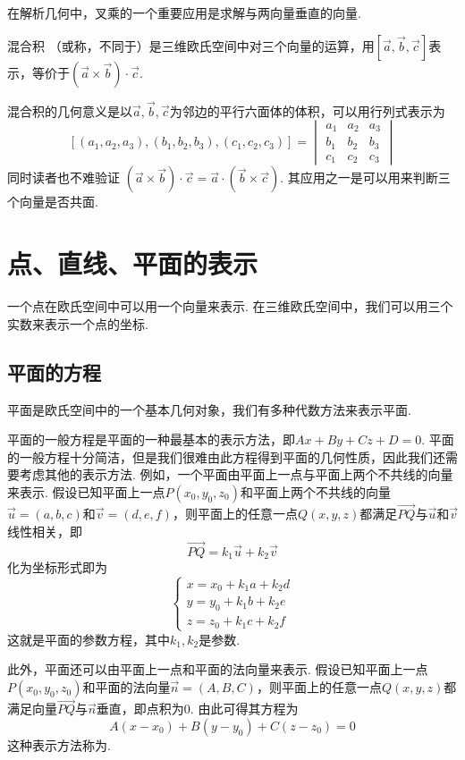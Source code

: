 在解析几何中，叉乘的一个重要应用是求解与两向量垂直的向量.
\begin{definition}{混合积}{}  
    （或称，不同于）是三维欧氏空间中对三个向量的运算，用$[\vec{a},\vec{b},\vec{c}]$表示，等价于$(\vec{a}\times\vec{b})\cdot\vec{c}$.
\end{definition}
混合积的几何意义是以$\vec{a},\vec{b},\vec{c}$为邻边的平行六面体的体积，可以用行列式表示为
\[[(a_1,a_2,a_3),(b_1,b_2,b_3),(c_1,c_2,c_3)]=\begin{vmatrix}
        a_1 & a_2 & a_3 \\
        b_1 & b_2 & b_3 \\
        c_1 & c_2 & c_3
    \end{vmatrix}\]
同时读者也不难验证 $ (\vec{a}\times\vec{b})\cdot\vec{c} = \vec{a}\cdot(\vec{b}\times\vec{c}) $. 其应用之一是可以用来判断三个向量是否共面.

\section{点、直线、平面的表示}

一个点在欧氏空间中可以用一个向量来表示. 在三维欧氏空间中，我们可以用三个实数来表示一个点的坐标.

\subsection{平面的方程}

平面是欧氏空间中的一个基本几何对象，我们有多种代数方法来表示平面.

平面的一般方程是平面的一种最基本的表示方法，即$Ax+By+Cz+D=0$. 平面的一般方程十分简洁，但是我们很难由此方程得到平面的几何性质，因此我们还需要考虑其他的表示方法. 例如，一个平面由平面上一点与平面上两个不共线的向量来表示. 假设已知平面上一点$P(x_0,y_0,z_0)$和平面上两个不共线的向量$\vec{u}=(a,b,c)$和$\vec{v}=(d,e,f)$，则平面上的任意一点$Q(x,y,z)$都满足$\overrightarrow{PQ}$与$\vec{u}$和$\vec{v}$线性相关，即
\[\overrightarrow{PQ}=k_1\vec{u}+k_2\vec{v}\]
化为坐标形式即为
\[\begin{cases}
        x=x_0+k_1a+k_2d \\
        y=y_0+k_1b+k_2e \\
        z=z_0+k_1c+k_2f
    \end{cases}\]
这就是平面的参数方程，其中$k_1,k_2$是参数.

此外，平面还可以由平面上一点和平面的法向量来表示. 假设已知平面上一点$P(x_0,y_0,z_0)$和平面的法向量$\vec{n}=(A,B,C)$，则平面上的任意一点$Q(x,y,z)$都满足向量$\overrightarrow{PQ}$与$\vec{n}$垂直，即点积为0. 由此可得其方程为\[A(x-x_0)+B(y-y_0)+C(z-z_0)=0\]这种表示方法称为.

